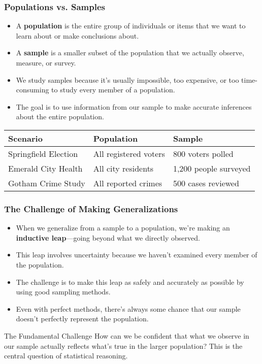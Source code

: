 \documentclass{beamer}
\begin{document}
	\begin{frame}
		\frametitle{Populations vs. Samples}
		
		\begin{itemize}
			\item A \textbf{population} is the entire group of individuals or items that we want to learn about or make conclusions about.
			\item A \textbf{sample} is a smaller subset of the population that we actually observe, measure, or survey.
			\item We study samples because it's usually impossible, too expensive, or too time-consuming to study every member of a population.
			\item The goal is to use information from our sample to make accurate inferences about the entire population.
		\end{itemize}
		
		\begin{center}
			\begin{tabular}{|l|l|l|}
				\hline
				\textbf{Scenario} & \textbf{Population} & \textbf{Sample} \\
				\hline
				Springfield Election & All registered voters & 800 voters polled \\
				\hline
				Emerald City Health & All city residents & 1,200 people surveyed \\
				\hline
				Gotham Crime Study & All reported crimes & 500 cases reviewed \\
				\hline
			\end{tabular}
		\end{center}
		
	\end{frame}
	
	\begin{frame}
		\frametitle{The Challenge of Making Generalizations}
		
		\begin{itemize}
			\item When we generalize from a sample to a population, we're making an \textbf{inductive leap}—going beyond what we directly observed.
			\item This leap involves uncertainty because we haven't examined every member of the population.
			\item The challenge is to make this leap as safely and accurately as possible by using good sampling methods.
			\item Even with perfect methods, there's always some chance that our sample doesn't perfectly represent the population.
		\end{itemize}
		
		\begin{alertblock}{The Fundamental Challenge}
			How can we be confident that what we observe in our sample actually reflects what's true in the larger population? This is the central question of statistical reasoning.
		\end{alertblock}
		
	\end{frame}
	
\end{document}

